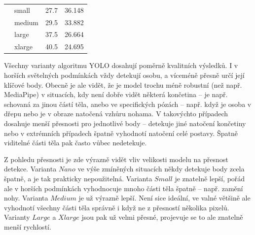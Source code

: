 \begin{table}[htbp]
\begin{tabular}{|c|l|l|l|}
                                           & small          & 27.7                    & 36.148                   \\ \cline{2-4}
                                           & medium         & 29.5                    & 33.882                   \\ \cline{2-4}
                                           & large          & 37.5                    & 26.664                   \\ \cline{2-4}
                                           & xlarge         & 40.5                    & 24.695                   \\ \hline
    \end{tabular}
\end{table}

Všechny varianty algoritmu YOLO dosahují poměrně kvalitních výsledků. I v
horších světelných podmínkách vždy detekují osobu, a víceméně přesně určí její
klíčové body. Obecně je ale vidět, že je model trochu méně robustní (než např.
MediaPipe) v situacích, kdy není dobře vidět některá končetina – je např.
schovaná za jinou částí těla, anebo ve specifických pózách – např. když je
osoba v dřepu nebo je v obraze natočená vzhůru nohama. V takovýchto případech
dosahuje menší přesnosti pro jednotlivé body – detekuje jiné natočení končetiny
nebo v extrémních případech špatně vyhodnotí natočení celé postavy. Špatně
viditelné části těla pak často vůbec nedetekuje.

Z pohledu přesnosti je zde výrazně vidět vliv velikosti modelu na přesnost
detekce. Varianta $Nano$ ve výše zmíněných situacích někdy detekuje body zcela
špatně, a je tak prakticky nepoužitelná. Varianta $Small$ je znatelně lepší,
pořád ale v horších podmínkách vyhodnocuje mnoho části těla špatně – např.
zamění nohy. Varianta $Medium$ je už výrazně lepší. Není sice ideální, ve valné
většině ale vyhodnotí všechny části těla správně i když ne z přesností několika
pixelů. Varianty $Large$ a $Xlarge$ jsou pak už velmi přesné, projevuje se to
ale znatelně menší rychlostí.

